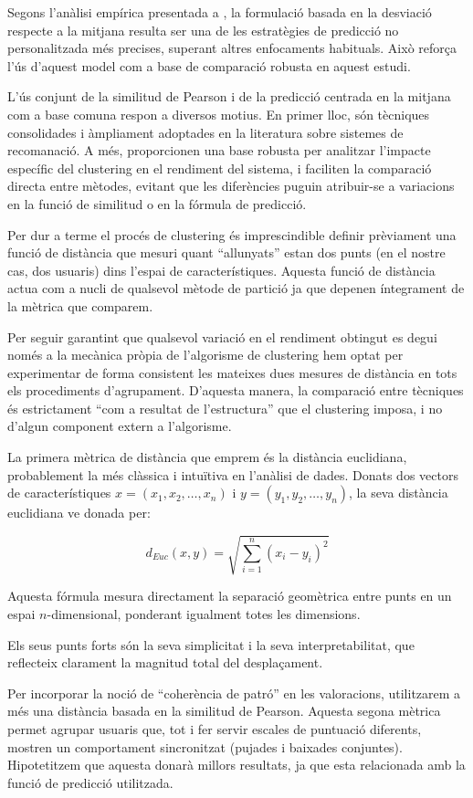 \documentclass[a4paper,12pt]{report}
\begin{document}
Segons l’anàlisi empírica presentada a \cite{herlocker2002empirical}, la formulació basada en la desviació respecte a la mitjana resulta ser una de les estratègies de predicció no personalitzada més precises, superant altres enfocaments habituals. Això reforça l’ús d’aquest model com a base de comparació robusta en aquest estudi.

L’ús conjunt de la similitud de Pearson i de la predicció centrada en la mitjana com a base comuna respon a diversos motius. En primer lloc, són tècniques consolidades i àmpliament adoptades en la literatura sobre sistemes de recomanació. A més, proporcionen una base robusta per analitzar l’impacte específic del clustering en el rendiment del sistema, i faciliten la comparació directa entre mètodes, evitant que les diferències puguin atribuir-se a variacions en la funció de similitud o en la fórmula de predicció.

Per dur a terme el procés de clustering és imprescindible definir prèviament una funció de distància que mesuri quant “allunyats” estan dos punts (en el nostre cas, dos usuaris) dins l’espai de característiques. Aquesta funció de distància actua com a nucli de qualsevol mètode de partició ja que depenen íntegrament de la mètrica que comparem.

Per seguir garantint que qualsevol variació en el rendiment obtingut es degui només a la mecànica pròpia de l’algorisme de clustering hem optat per experimentar de forma consistent les mateixes dues mesures de distància en tots els procediments d’agrupament. D’aquesta manera, la comparació entre tècniques és estrictament “com a resultat de l’estructura” que el clustering imposa, i no d’algun component extern a l’algorisme.

La primera mètrica de distància que emprem és la distància euclidiana, probablement la més clàssica i intuïtiva en l’anàlisi de dades. Donats dos vectors de característiques $x = (x_1, x_2, \ldots, x_n)$ i $y = (y_1, y_2, \ldots, y_n)$, la seva distància euclidiana ve donada per:

\[
d_{Euc}(x,y) = \sqrt{\sum_{i=1}^{n} (x_i - y_i)^2}
\]

Aquesta fórmula mesura directament la separació geomètrica entre punts en un espai $n$-dimensional, ponderant igualment totes les dimensions.

Els seus punts forts són la seva simplicitat i la seva interpretabilitat, que reflecteix clarament la magnitud total del desplaçament.

Per incorporar la noció de “coherència de patró” en les valoracions, utilitzarem a més una distància basada en la similitud de Pearson. 
Aquesta segona mètrica permet agrupar usuaris que, tot i fer servir escales de puntuació diferents, mostren un comportament sincronitzat (pujades i baixades conjuntes). 
Hipotetitzem que aquesta donarà millors resultats, ja que esta relacionada amb la funció de predicció utilitzada. 
\end{document}

